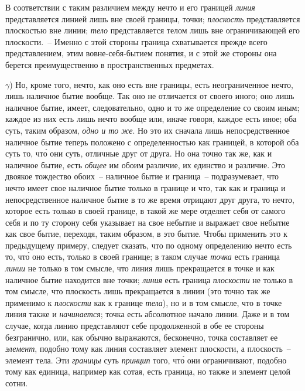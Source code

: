 В соответствии с таким различием между нечто и его
границей \emph{линия} представляется линией лишь вне своей
границы, точки; \emph{плоскость} представляется плоскостью
вне линии; \emph{тело} представляется телом лишь вне ограничивающей
его плоскости.~-- Именно с этой стороны граница
схватывается прежде всего представлением, этим
вовне-себя-бытием понятия, и с этой же стороны она
берется преимущественно в пространственных предметах.

$\gamma$) Но, кроме того, нечто, как оно есть вне границы,
есть неограниченное нечто, лишь наличное бытие вообще.
Так оно не отличается от своего иного; оно лишь
наличное бытие, имеет, следовательно, одно и то же определение
со своим иным; каждое из них есть лишь нечто
вообще или, иначе говоря, каждое есть иное; оба суть,
таким образом, \emph{одно и то же}. Но это их сначала лишь
непосредственное наличное бытие теперь положено с
определенностью как границей, в которой оба суть то,
чт\'о они суть, отличные друг от друга. Но она точно так
же, как и наличное бытие, есть \emph{общее} им обоим различие,
их единство и различие. Это двоякое тождество
обоих~-- наличное бытие и граница~-- подразумевает, что
нечто имеет свое наличное бытие только в границе и
что, так как и граница и непосредственное наличное бытие
в то же время отрицают друг друга, то нечто, которое
есть только в своей границе, в такой же мере отделяет
себя от самого себя и по ту сторону себя указывает
на свое небытие и выражает свое небытие как свое бытие,
переходя, таким образом, в это бытие. Чтобы применить
это к предыдущему примеру, следует сказать, что по
одному определению нечто есть то, чт\'о оно есть, только
в своей границе; в таком случае \emph{точка} есть граница
\emph{линии} не только в том смысле, что линия лишь прекращается
в точке и как наличное бытие находится вне точки;
\emph{линия} есть граница \emph{плоскости} не только в том смысле,
что плоскость лишь прекращается в линии (это точно
так же применимо к \emph{плоскости} как к границе \emph{тела}),
но и в том смысле, что в точке линия также и \emph{начинается};
точка есть абсолютное начало линии. Даже и в том
случае, когда линию представляют себе продолженной
в обе ее стороны безгранично, или, как обычно выражаются,
бесконечно, точка составляет ее \emph{элемент}, подобно
тому как линия составляет элемент плоскости, а плоскость~--
элемент тела. Эти \emph{границы} суть \emph{принцип} того,
чт\'о они ограничивают, подобно тому как единица, например
как сотая, есть граница, но также и элемент целой
сотни.

